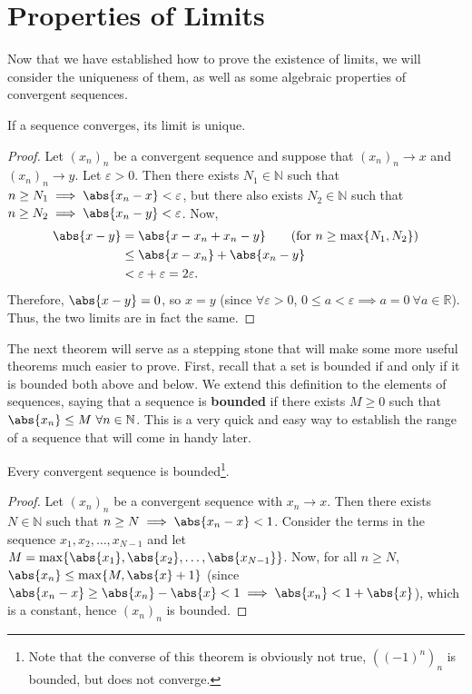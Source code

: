 \documentclass[../real_analysis.tex]{subfiles}
\begin{document}
    \section{Properties of Limits}
        Now that we have established how to prove the existence of limits, we will consider the uniqueness of them, as well as some algebraic properties of convergent sequences.
        \begin{theorem}
            If a sequence converges, its limit is unique.
        \end{theorem}
        \begin{proof}
            Let $(x_n)_n$ be a convergent sequence and suppose that $(x_n)_n\to x$ and $(x_n)_n\to y$. Let $\varepsilon>0$. Then there exists $N_1\in\mathbb{N}$ such that $n\geq N_1\implies\abs{x_n-x}<\varepsilon$, but there also exists $N_2\in\mathbb{N}$ such that $n\geq N_2\implies\abs{x_n-y}<\varepsilon$.
            Now,
            \begin{align}
                \abs{x-y} &= \abs{x-x_n+x_n-y}\tag{for $n\geq\max\{N_1, N_2\}$}\\
                &\leq\abs{x-x_n}+\abs{x_n-y}\\
                &<\varepsilon+\varepsilon=2\varepsilon.
            \end{align}
            Therefore, $\abs{x-y}=0$, so $x=y$ (since $\forall\varepsilon>0$, $0\leq a<\varepsilon\implies a=0\ \forall a\in\mathbb{R}$). Thus, the two limits are in fact the same.
        \end{proof}
        The next theorem will serve as a stepping stone that will make some more useful theorems much easier to prove. First, recall that a set is bounded if and only if it is bounded both above and below. We extend this definition to the elements of sequences, saying that a sequence is \textbf{bounded} if there exists $M\geq0$ such that $\abs{x_n}\leq M\ \forall n\in\mathbb{N}$. This is a very quick and easy way to establish the range of a sequence that will come in handy later.
        \begin{theorem}\label{cvg-seq-bounded}
            Every convergent sequence is bounded\footnote{Note that the converse of this theorem is obviously not true, $((-1)^n)_n$ is bounded, but does not converge.}.
        \end{theorem}
        \begin{proof}
            Let $(x_n)_n$ be a convergent sequence with $x_n\to x$. Then there exists $N\in\mathbb{N}$ such that $n\geq N\implies\abs{x_n-x}<1$. Consider the terms in the sequence $x_1, x_2,\dots,x_{N-1}$ and let $M=\max\{\abs{x_1},\abs{x_2},\dots,\abs{x_{N-1}}\}$.
            Now, for all $n\geq N$, $\abs{x_n}\leq\max\{M, \abs{x}+1\}$ (since $\abs{x_n-x}\geq\abs{x_n}-\abs{x}<1\implies\abs{x_n}<1+\abs{x}$), which is a constant, hence $(x_n)_n$ is bounded.
        \end{proof}
\end{document}
